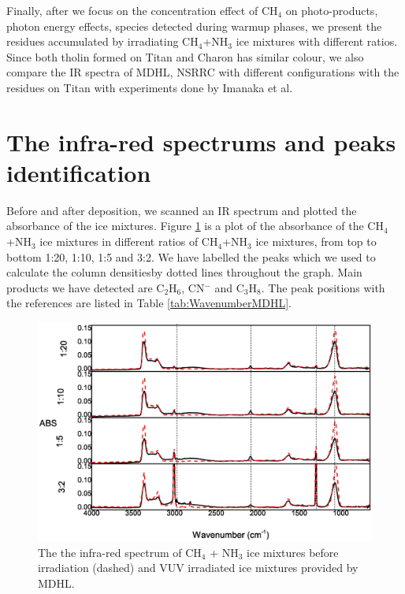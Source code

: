 Finally, after we focus on the concentration effect of CH$_4$ on photo-products, photon energy effects, species detected during warmup phases, we present the residues accumulated by irradiating CH$_4$+NH$_3$ ice mixtures with different ratios. Since both tholin formed on Titan and Charon has similar colour, we also compare the IR spectra of MDHL, NSRRC with different configurations with the residues on Titan with experiments done by Imanaka et al. \cite{imanaka2004laboratory}\\
\section{The infra-red spectrums and peaks identification}
Before and after deposition, we scanned an IR spectrum and plotted the absorbance of the ice mixtures. Figure \ref{fig:widerange} is a plot of the absorbance of the CH$_4$+NH$_3$ ice mixtures in different ratios of CH$_4$+NH$_3$ ice mixtures, from top to bottom 1:20, 1:10, 1:5 and 3:2. We have labelled the peaks which we used to calculate the column densitiesby dotted lines throughout the graph. Main products we have detected are C$_2$H$_6$, CN$^-$ and C$_3$H$_8$. The peak positions with the references are listed in Table \ref{tab:WavenumberMDHL}.\\

\begin{figure}
\centering
\includegraphics[width=\textwidth]{figures/chapter3/widerange.eps}
\caption{The the infra-red spectrum of CH$_4$ + NH$_3$ ice mixtures before irradiation (dashed) and VUV irradiated ice mixtures provided by MDHL. }
\label{fig:widerange}
\end{figure}


